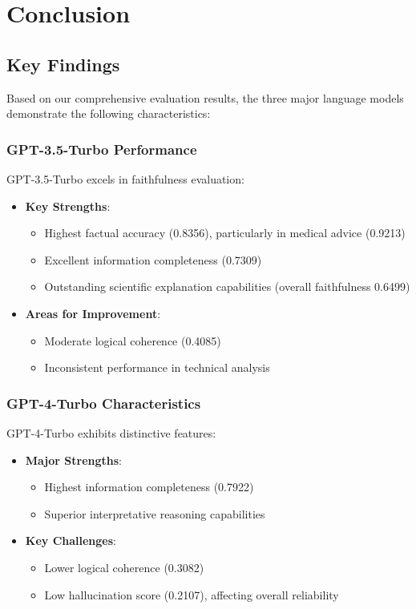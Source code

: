 \section{Conclusion}

\subsection{Key Findings}
Based on our comprehensive evaluation results, the three major language models demonstrate the following characteristics:

\subsubsection{GPT-3.5-Turbo Performance}
GPT-3.5-Turbo excels in faithfulness evaluation:
\begin{itemize}
    \item \textbf{Key Strengths}:
    \begin{itemize}
        \item Highest factual accuracy (0.8356), particularly in medical advice (0.9213)
        \item Excellent information completeness (0.7309)
        \item Outstanding scientific explanation capabilities (overall faithfulness 0.6499)
    \end{itemize}
    \item \textbf{Areas for Improvement}:
    \begin{itemize}
        \item Moderate logical coherence (0.4085)
        \item Inconsistent performance in technical analysis
    \end{itemize}
\end{itemize}

\subsubsection{GPT-4-Turbo Characteristics}
GPT-4-Turbo exhibits distinctive features:
\begin{itemize}
    \item \textbf{Major Strengths}:
    \begin{itemize}
        \item Highest information completeness (0.7922)
        \item Superior interpretative reasoning capabilities
    \end{itemize}
    \item \textbf{Key Challenges}:
    \begin{itemize}
        \item Lower logical coherence (0.3082)
        \item Low hallucination score (0.2107), affecting overall reliability
    \end{itemize}
\end{itemize}

